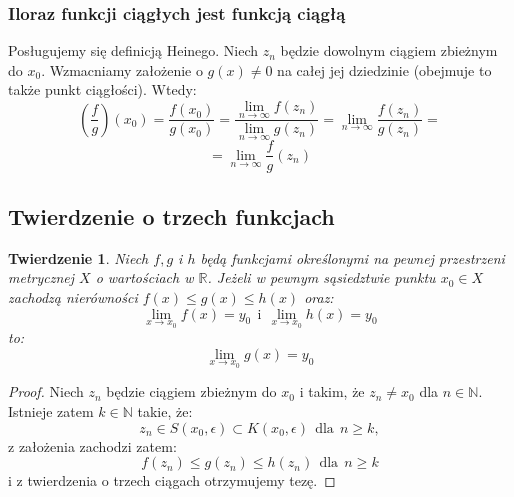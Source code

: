 \documentclass{article}
\newtheorem*{theorem}{Twierdzenie}
\begin{document}
\subsubsection{Iloraz funkcji ciągłych jest funkcją ciągłą}
Posługujemy się definicją Heinego. Niech \(z_n\) będzie dowolnym ciągiem zbieżnym do \(x_0\). 
Wzmacniamy założenie o \(g(x) \neq 0\) na całej jej dziedzinie (obejmuje to także punkt ciągłości). Wtedy:
\begin{equation*}
    (\frac{f}{g})(x_0) = \frac{f(x_0)}{g(x_0)} = \frac{\lim_{n \to \infty} f(z_n)}{\lim_{n \to \infty} g(z_n)} = \lim_{n \to \infty}\frac{f(z_n)}{g(z_n)} = 
\end{equation*}
\begin{equation*}
    = \lim_{n \to \infty}\frac{f}{g}(z_n)
\end{equation*} 

\subsection{Twierdzenie o trzech funkcjach}
\begin{theorem}
    Niech \(f, g\) i \(h\) będą funkcjami określonymi na pewnej przestrzeni metrycznej \(X\) o
    wartościach w \(\mathbb{R}\). Jeżeli w pewnym sąsiedztwie punktu \(x_0 \in X\) zachodzą 
    nierówności \(f(x) \leq g(x) \leq h(x)\) oraz:
    \begin{equation*}
        \lim_{x \to x_0} f(x) = y_0 \ \ \mbox{i} \ \ \lim_{x \to x_0} h(x) = y_0 
    \end{equation*}
    to:
    \begin{equation*}
        \lim_{x \to x_0} g(x) = y_0
    \end{equation*}
\end{theorem}
\begin{proof}
    Niech \(z_n\) będzie ciągiem zbieżnym do \(x_0\) i takim, że \(z_n \neq x_0\) dla \(n \in \mathbb{N}\).
    Istnieje zatem \(k \in \mathbb{N}\) takie, że:
    \begin{equation*}
        z_n \in S(x_0, \epsilon) \subset K(x_0, \epsilon) \ \ \mbox{dla} \ \ n \geq k,
    \end{equation*}
    z założenia zachodzi zatem:
    \begin{equation*}
        f(z_n) \leq g(z_n) \leq h(z_n) \ \ \mbox{dla} \ \ n \geq k
    \end{equation*}
    i z twierdzenia o trzech ciągach otrzymujemy tezę.
\end{proof}
\end{document}

